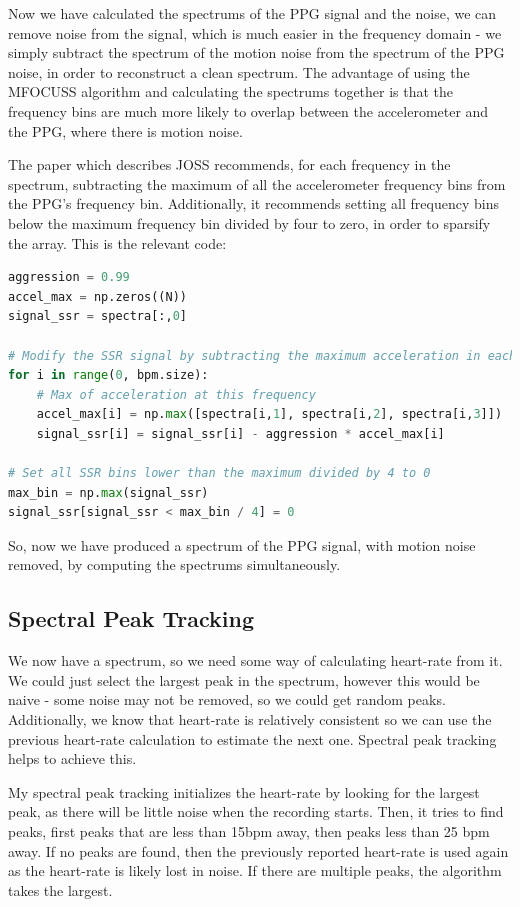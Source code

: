 \documentclass[12pt,a4paper,twoside,openany]{report}
\begin{document}
Now we have calculated the spectrums of the PPG signal and the noise, we can
remove noise from the signal, which is much easier in the frequency domain -
we simply subtract the spectrum of the motion noise from the spectrum of the
PPG noise, in order to reconstruct a clean spectrum. The advantage of using
the MFOCUSS algorithm and calculating the spectrums together is that the
frequency bins are much more likely to overlap between the accelerometer and
the PPG, where there is motion noise. 

The paper which describes JOSS \cite{Zhang15.2} recommends, for each frequency in the spectrum,
subtracting the maximum of all the accelerometer frequency bins from the PPG's
frequency bin. Additionally, it recommends setting all frequency bins below 
the maximum frequency bin divided by four to zero, in order to sparsify the array.
This is the relevant code:

\begin{lstlisting}[language=Python]
aggression = 0.99
accel_max = np.zeros((N))
signal_ssr = spectra[:,0]

# Modify the SSR signal by subtracting the maximum acceleration in each bin
for i in range(0, bpm.size):
    # Max of acceleration at this frequency
    accel_max[i] = np.max([spectra[i,1], spectra[i,2], spectra[i,3]])
    signal_ssr[i] = signal_ssr[i] - aggression * accel_max[i]

# Set all SSR bins lower than the maximum divided by 4 to 0
max_bin = np.max(signal_ssr)
signal_ssr[signal_ssr < max_bin / 4] = 0
\end{lstlisting}

So, now we have produced a spectrum of the PPG signal, with motion noise
removed, by computing the spectrums simultaneously.

\subsection{Spectral Peak Tracking}

We now have a spectrum, so we need some way of calculating heart-rate from it.
We could just select the largest peak in the spectrum, however this would be
naive - some noise may not be removed, so we could get random peaks.
Additionally, we know that heart-rate is relatively consistent so we can use
the previous heart-rate calculation to estimate the next one. Spectral peak
tracking helps to achieve this.

My spectral peak tracking initializes the heart-rate by looking for the
largest peak, as there will be little noise when the recording starts. Then,
it tries to find peaks, first peaks that are less than 15bpm away, then peaks
less than 25 bpm away. If no peaks are found, then the previously reported
heart-rate is used again as the heart-rate is likely lost in noise. If there
are multiple peaks, the algorithm takes the largest.
\end{document}
